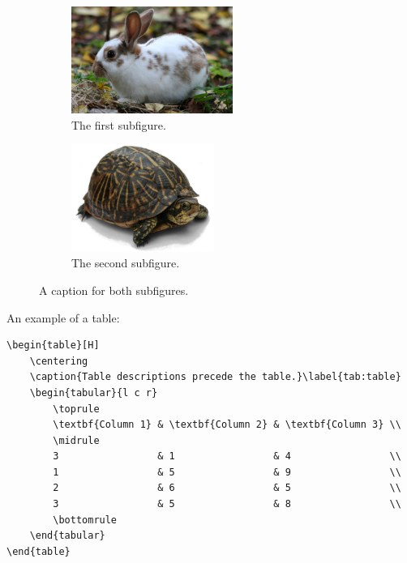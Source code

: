 \documentclass[11pt, twoside]{article}
\begin{document}
\begin{outputbox}
    \begin{figure}[H]
        \centering
        \begin{subfigure}{0.47\linewidth}
            \centering
            \includegraphics[height=3.5cm]{images/rabbit.jpg}
            \caption{The first subfigure.}
        \end{subfigure}
        \begin{subfigure}{0.47\linewidth}
            \centering
            \includegraphics[height=3.5cm]{images/turtle.jpg}
            \caption{The second subfigure.}\label{fig:turtle}
        \end{subfigure}
        \caption{A caption for both subfigures.}
    \end{figure}
\end{outputbox}
\pagebreak
An example of a table:
\begin{verbatim}
\begin{table}[H]
    \centering
    \caption{Table descriptions precede the table.}\label{tab:table}
    \begin{tabular}{l c r}
        \toprule
        \textbf{Column 1} & \textbf{Column 2} & \textbf{Column 3} \\
        \midrule
        3                 & 1                 & 4                 \\
        1                 & 5                 & 9                 \\
        2                 & 6                 & 5                 \\
        3                 & 5                 & 8                 \\
        \bottomrule
    \end{tabular}
\end{table}
\end{verbatim}
\end{document}
